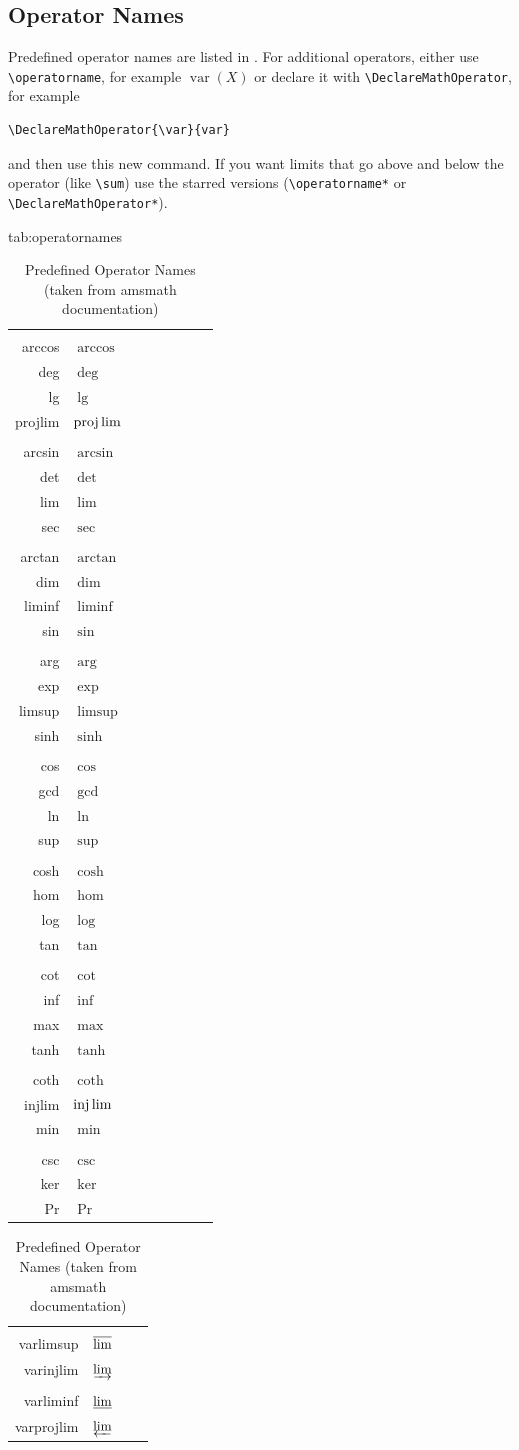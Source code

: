 \documentclass[pmlr]{jmlr}%
\newcommand{\cs}[1]{\texttt{\char`\\#1}}
\begin{document}
\subsection{Operator Names}
\label{sec:op}

Predefined operator names are listed in .
For additional operators, either use \verb|\operatorname|,
for example $\operatorname{var}(X)$ or declare it with
\verb|\DeclareMathOperator|, for example
\begin{verbatim}
\DeclareMathOperator{\var}{var}
\end{verbatim}
and then use this new command. If you want limits that go above and
below the operator (like \verb|\sum|) use the starred versions
(\verb|\operatorname*| or \verb|\DeclareMathOperator*|).

\begin{table}[htbp]
\floatconts
  {tab:operatornames}%
  {\caption{Predefined Operator Names (taken from 
   \textsf{amsmath} documentation)}}%
  {%
\begin{tabular}{rlrlrlrl}
\cs{arccos} & $\arccos$ &  \cs{deg} & $\deg$ &  \cs{lg} & $\lg$ &  \cs{projlim} & $\projlim$ \\
\cs{arcsin} & $\arcsin$ &  \cs{det} & $\det$ &  \cs{lim} & $\lim$ &  \cs{sec} & $\sec$ \\
\cs{arctan} & $\arctan$ &  \cs{dim} & $\dim$ &  \cs{liminf} & $\liminf$ &  \cs{sin} & $\sin$ \\
\cs{arg} & $\arg$ &  \cs{exp} & $\exp$ &  \cs{limsup} & $\limsup$ &  \cs{sinh} & $\sinh$ \\
\cs{cos} & $\cos$ &  \cs{gcd} & $\gcd$ &  \cs{ln} & $\ln$ &  \cs{sup} & $\sup$ \\
\cs{cosh} & $\cosh$ &  \cs{hom} & $\hom$ &  \cs{log} & $\log$ &  \cs{tan} & $\tan$ \\
\cs{cot} & $\cot$ &  \cs{inf} & $\inf$ &  \cs{max} & $\max$ &  \cs{tanh} & $\tanh$ \\
\cs{coth} & $\coth$ &  \cs{injlim} & $\injlim$ &  \cs{min} & $\min$ \\
\cs{csc} & $\csc$ &  \cs{ker} & $\ker$ &  \cs{Pr} & $\Pr$
\end{tabular}\par
\begin{tabular}{rlrl}
\cs{varlimsup} & $\varlimsup$ 
& \cs{varinjlim} & $\varinjlim$\\
\cs{varliminf} & $\varliminf$ 
& \cs{varprojlim} & $\varprojlim$
\end{tabular}
}
\end{table}
\end{document}
